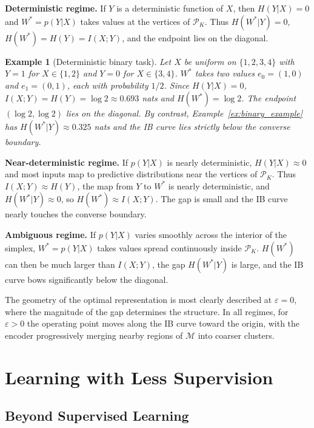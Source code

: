 \documentclass[11pt]{article}
\newtheorem{example}{Example}
\begin{document}
\medskip
\noindent\textbf{Deterministic regime.}
If $Y$ is a deterministic function of $X$, then $H(Y|X)=0$ and
$W^*=p(Y|X)$ takes values at the vertices of $\mathcal{P}_K$.
Thus $H(W^*|Y)=0$, $H(W^*)=H(Y)=I(X;Y)$, and the endpoint lies on the diagonal.

\begin{example}[Deterministic binary task]
Let $X$ be uniform on $\{1,2,3,4\}$ with $Y=1$ for $X\in\{1,2\}$ and
$Y=0$ for $X\in\{3,4\}$.
$W^*$ takes two values $e_0=(1,0)$ and $e_1=(0,1)$, each with
probability $1/2$.
Since $H(Y|X)=0$, $I(X;Y)=H(Y)=\log 2\approx 0.693$ nats and
$H(W^*)=\log 2$. The endpoint $(\log 2,\log 2)$ lies on the diagonal.
By contrast, Example~\ref{ex:binary_example} has $H(W^*|Y)\approx 0.325$ nats
and the IB curve lies strictly below the converse boundary.
\end{example}

\medskip
\noindent\textbf{Near-deterministic regime.}
If $p(Y|X)$ is nearly deterministic, $H(Y|X)\approx 0$ and most
inputs map to predictive distributions near the vertices of $\mathcal{P}_K$.
Thus $I(X;Y)\approx H(Y)$, the map from $Y$ to $W^*$ is nearly
deterministic, and $H(W^*|Y)\approx 0$, so $H(W^*)\approx I(X;Y)$.
The gap is small and the IB curve nearly touches the converse boundary.

\medskip
\noindent\textbf{Ambiguous regime.}
If $p(Y|X)$ varies smoothly across the interior of the simplex,
$W^*=p(Y|X)$ takes values spread continuously inside $\mathcal{P}_K$.
$H(W^*)$ can then be much larger than $I(X;Y)$, the gap $H(W^*|Y)$
is large, and the IB curve bows significantly below the diagonal.

\medskip
The geometry of the optimal representation is most clearly described
at $\varepsilon=0$, where the magnitude of the gap determines the structure.
In all regimes, for $\varepsilon>0$ the operating point moves along the
IB curve toward the origin, with the encoder progressively merging
nearby regions of $\mathcal{M}$ into coarser clusters.


\section{Learning with Less Supervision}
\label{sec:less_supervision}

\subsection{Beyond Supervised Learning}
\end{document}
